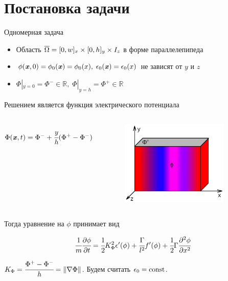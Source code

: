 
\section{Постановка задачи}

\begin{frame}{Одномерная задача}
\vspace{-0.3cm}
\begin{itemize}
	\item Область ${\overline{\Omega}} = [0, w]_x \times [0, h]_y \times I_z$ в форме параллелепипеда
	\item $\phi({\textbf{\textit{x}}}, 0) = \phi_0({\textbf{\textit{x}}}) = \phi_0(x), \; \epsilon_0({\textbf{\textit{x}}}) =
	\epsilon_0(x)$ не зависят от $y$ и $z$
	\item $\Phi|_{y = 0} = \Phi^- \in \mathbb{R}, \; \Phi|_{y = h} = \Phi^+ \in \mathbb{R}$
\end{itemize}
\vspace{0.3cm}
Решением является функция электрического потенциала
\begin{columns}
\vspace{-1cm}
$$\Phi(\vx, t) = \Phi^- \hm + \cfrac{y}{h}(\Phi^+ - \Phi^-)$$
\begin{figure}
	\vspace*{-2cm}
	\hspace*{0.5cm}
	\includegraphics[width=0.85\textwidth]{figures/one_dim_problem.jpg}
\end{figure}
\end{columns}
\vspace{-0.4cm}
Тогда уравнение на $\phi$ принимает вид
\begin{block}{}
	$$\cfrac{1}{m} \cfrac{\partial \phi}{\partial t} = \cfrac{1}{2} K_\Phi^2 \epsilon'(\phi) +
	\cfrac{\Gamma}{l^2} f'(\phi) + \cfrac{1}{2} \Gamma \cfrac{\partial^2 \phi}{\partial x^2}$$
\end{block}
$K_\Phi = \cfrac{\Phi^+ - \Phi^-}{h} = \| \nabla \Phi \|$. Будем считать $\epsilon_0 = \operatorname{{const}}$.
\end{frame}


